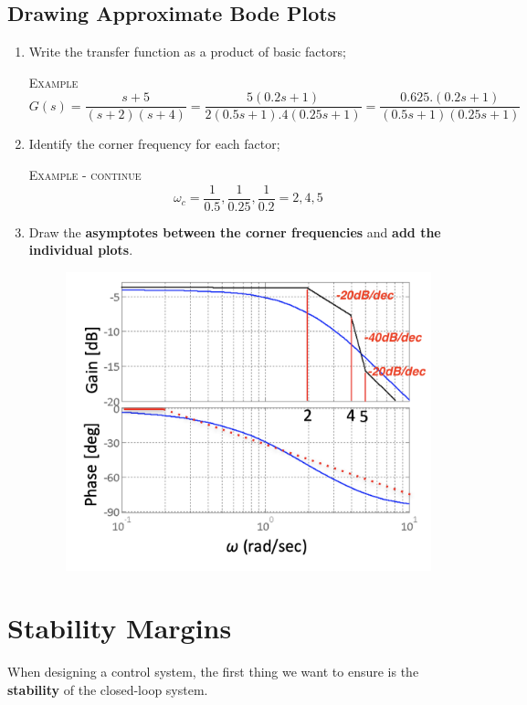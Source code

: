 \documentclass[12pt,a4paper]{article}
\begin{document}
\subsection{Drawing Approximate Bode Plots}
\begin{enumerate}
\item Write the transfer function as a product of basic factors;
\begin{tcolorbox}[breakable]
\textsc{Example}
\[G(s) = \frac{s+5}{(s+2)(s+4)}=\frac{5(0.2s+1)}{2(0.5s+1).4(0.25s+1)} = \frac{0.625. (0.2s+1)}{(0.5s+1)(0.25s+1)}\]
\end{tcolorbox}

\item Identify the corner frequency for each factor;
\begin{tcolorbox}[breakable]
\textsc{Example - continue} 
\[\omega_{c} = \frac{1}{0.5} , \frac{1}{0.25} , \frac{1}{0.2} = 2,4,5\]
\end{tcolorbox}
\item Draw the \textbf{asymptotes between the corner frequencies} and \textbf{add the individual plots}.
\begin{figure}[H] \centering
\includegraphics[width=.6\textwidth]{images/bode_plot.png}
\end{figure}
\end{enumerate}

\newpage
\section{Stability Margins}
When designing a control system,  the first thing we want to ensure is the \textbf{stability} of the closed-loop system.
\end{document}
